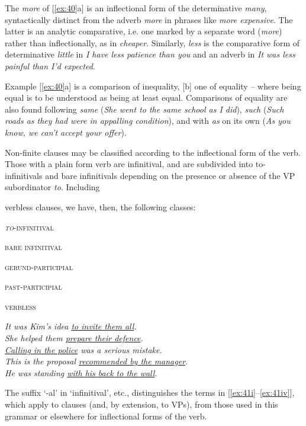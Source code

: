 The \textit{more} of [\ref{ex:40}a] is an inflectional form of the determinative \textit{many}, syntactically distinct from the adverb \textit{more} in phrases like \textit{more expensive}. The latter is an {analytic comparative}, i.e. one marked by a separate word (\textit{more}) rather than inflectionally, as in \textit{cheaper}. Similarly, \textit{less} is the comparative form of determinative \textit{little} in \textit{I have less patience than you} and an adverb in \textit{It was less painful than I'd expected}.

Example [\ref{ex:40}a] is a {comparison of inequality}, [b] one of {equality} -- where being equal is to be understood as being at least equal. Comparisons of equality are also found following \textit{same} (\textit{She went to the same school as I did}), \textit{such} (\textit{Such roads as they had were in appalling condition}), and with \textit{as} on its own (\textit{As you know, we can't accept your offer}).


Non-finite clauses may be classified according to the inflectional form of the verb. Those with a plain form verb are infinitival, and are subdivided into to-infinitivals and bare infinitivals depending on the presence or absence of the VP subordinator \textit{to}. Including

\newpage

\noindent verbless clauses, we have, then, the following classes:
\begin{examples}
    \item \label{ex:41}
    \noindent\begin{minipage}[t]{0.3\linewidth}\vspace{-6pt}
        \begin{examples}
        \item\label{ex:41i}\textsc{\textit{to}-infinitival}
        \item\label{ex:41ii}\textsc{bare infinitival}
        \item\label{ex:41ii}\textsc{gerund-participial}
        \item\label{ex:41iv}\textsc{past-participial}
        \item\label{ex:41v}\textsc{verbless}
        \end{examples}
    \end{minipage}
    \begin{minipage}[t]{0.7\linewidth}
        \textit{It was Kim's idea \uline{to invite them all}.}\\
        \textit{She helped them \uline{prepare their defence}.}\\
        \textit{\uline{Calling in the police} was a serious mistake.}\\
        \textit{This is the proposal \uline{recommended by the manager}.}\\
        \textit{He was standing \uline{with his back to the wall}.}
    \end{minipage}
\end{examples}
The suffix `-al' in `infinitival', etc., distinguishes the terms in [\ref{ex:41i}--\ref{ex:41iv}], which apply to clauses (and, by extension, to VPs), from those used in this grammar or elsewhere for inflectional forms of the verb.

